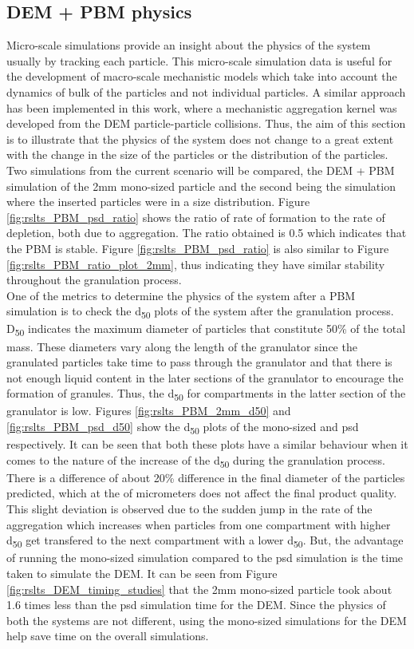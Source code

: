 \documentclass[preprint,11pt,authoryear]{elsarticle}
\begin{document}
\subsection{DEM + PBM physics}
 Micro-scale simulations provide an insight about the physics of the system usually by tracking 
each particle. This micro-scale simulation data is useful for the development of macro-scale 
mechanistic models which take into account the dynamics of bulk of the particles and not individual 
particles. A similar approach has been implemented in this work, where a mechanistic aggregation 
kernel was developed from the DEM particle-particle collisions. Thus, the aim of this section is to 
illustrate that the physics of the system does not change to a great extent with the change in the size 
of the particles or the distribution of the particles.\\
Two simulations from the current scenario will be compared, the DEM + PBM simulation of the 2mm 
mono-sized particle and the second being the simulation where the inserted particles were in a size 
distribution. Figure \ref{fig:rslts_PBM_psd_ratio} shows the ratio of rate of formation to the rate of 
depletion, both due to aggregation. The ratio obtained is 0.5 which indicates that the PBM is stable. 
Figure \ref{fig:rslts_PBM_psd_ratio} is also similar to Figure \ref{fig:rslts_PBM_ratio_plot_2mm}, thus 
indicating they have similar stability throughout the granulation process. \\
One of the metrics to determine the physics of the system after a PBM simulation is to check the 
d\textsubscript{50} plots of the system after the granulation process. D\textsubscript{50} indicates the 
maximum diameter of particles that constitute 50\% of the total mass. These diameters vary along the 
length of the granulator since the granulated particles take time to pass through the granulator and 
that there is not enough liquid content in the later sections of the granulator to encourage the 
formation of granules. Thus, the d\textsubscript{50} for compartments in the latter section of the 
granulator is low. Figures \ref{fig:rslts_PBM_2mm_d50} and \ref{fig:rslts_PBM_psd_d50} show the 
d\textsubscript{50} plots of the mono-sized and psd respectively. It can be seen that both these plots 
have a similar behaviour when it comes to the nature of the increase of the d\textsubscript{50} during 
the granulation process. There is a difference of about 20\% difference in the final diameter of the 
particles predicted, which at the of micrometers does not affect the final product quality. This slight 
deviation is observed due to the sudden jump in the rate of the aggregation which increases when 
particles from one compartment with higher d\textsubscript{50} get transfered to the next 
compartment with a lower d\textsubscript{50}. But, the advantage of running the mono-sized 
simulation compared to the psd simulation is the time taken to simulate the DEM. It can be seen from 
Figure \ref{fig:rslts_DEM_timing_studies} that the 2mm mono-sized particle took about 1.6 times less 
than the psd simulation time for the DEM. Since the physics of both the systems are not different, 
using the mono-sized simulations for the DEM help save time on the overall simulations. 
\end{document}
